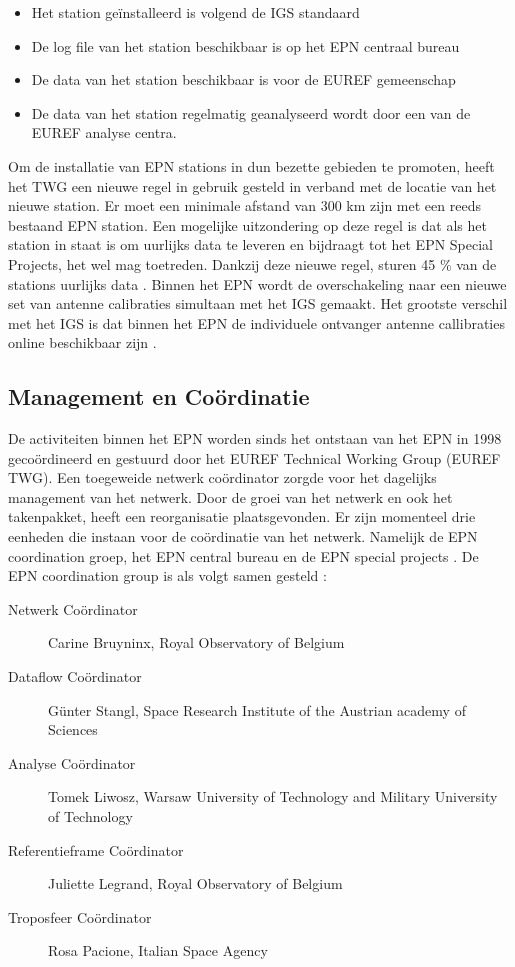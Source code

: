 \begin{itemize}
	\item Het station ge\"installeerd is volgend de IGS standaard
	\item De log file van het station beschikbaar is op het EPN centraal bureau
	\item De data van het station beschikbaar is voor de EUREF gemeenschap
	\item De data van het station regelmatig geanalyseerd wordt door een van de EUREF analyse centra. 
\end{itemize} 
Om de installatie van EPN stations in dun bezette gebieden te promoten, heeft het TWG een nieuwe regel in gebruik gesteld in verband met de locatie van het nieuwe station. Er moet een minimale afstand van 300 km zijn met een reeds bestaand EPN station. Een mogelijke uitzondering op deze regel is dat als het station in staat is om uurlijks data te leveren en bijdraagt tot het EPN Special Projects, het wel mag toetreden. Dankzij deze nieuwe regel, sturen 45 \% van de stations uurlijks data \cite{LBibEPN6}. Binnen het EPN wordt de overschakeling naar een nieuwe set van antenne calibraties simultaan met het IGS gemaakt. Het grootste verschil met het IGS is dat binnen het EPN de individuele ontvanger antenne callibraties online beschikbaar zijn \cite{LBibEPN4}.

\subsection{Management en Co\"ordinatie}
De activiteiten binnen het EPN worden sinds het ontstaan van het EPN in 1998 geco\"ordineerd en gestuurd door het EUREF Technical Working Group (EUREF TWG). Een toegeweide netwerk co\"ordinator zorgde voor het dagelijks management van het netwerk. Door de groei van het netwerk en ook het takenpakket, heeft  een reorganisatie plaatsgevonden. Er zijn momenteel drie eenheden die instaan voor de co\"ordinatie van het netwerk. Namelijk de EPN coordination groep, het EPN central bureau en de EPN special projects \cite{LBibEPN6}. 
De EPN coordination group is als volgt samen gesteld \cite{LBibEPN8}:
\begin{description}
	\item[Netwerk Co\"ordinator] Carine Bruyninx, Royal Observatory of Belgium
	\item[Dataflow Co\"ordinator] G\"unter Stangl, Space Research Institute of the Austrian academy of Sciences
	\item[Analyse Co\"ordinator] Tomek Liwosz, Warsaw University of Technology and Military University of Technology
	\item[Referentieframe Co\"ordinator] Juliette Legrand, Royal Observatory of Belgium
	\item[Troposfeer Co\"ordinator] Rosa Pacione, Italian Space Agency
\end{description}

